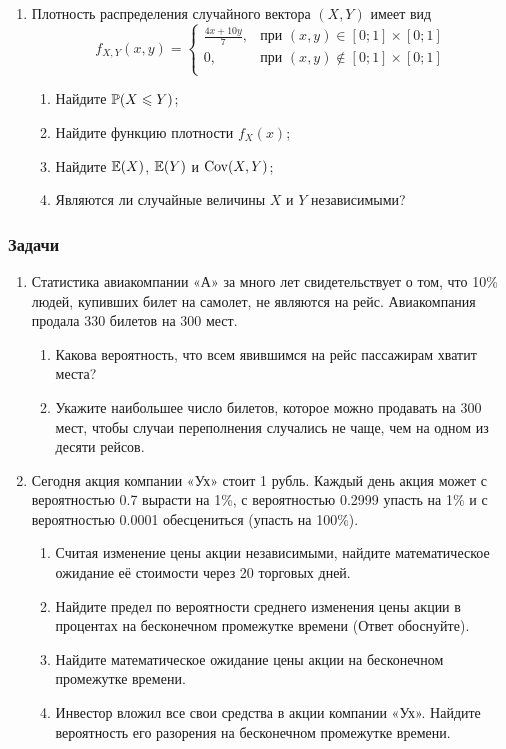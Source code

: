 \begin{enumerate}
\item Плотность распределения случайного вектора $(X,Y)$ имеет вид
\[
f_{X,Y}(x,y) =
\begin{cases}
\frac{4x+10y}{7}, & \text{при } (x,y) \in [0;1] \times [0;1] \\
0 , & \text{при } (x,y) \not\in [0;1] \times [0;1] \\
\end{cases}
\]
\begin{enumerate}
\item Найдите $\P(X \leq Y)$;
\item Найдите функцию плотности $f_X(x)$;
\item Найдите $\E(X)$, $\E(Y)$ и $\Cov(X, Y)$;
\item Являются ли случайные величины $X$ и $Y$ независимыми?
\end{enumerate}
\end{enumerate}

\subsubsection*{Задачи}

\begin{enumerate}[resume]

\item Статистика авиакомпании «А» за много лет свидетельствует о том, что 10\% людей, купивших билет на самолет, не являются на рейс. Авиакомпания продала 330 билетов на 300 мест.
\begin{enumerate}
\item Какова вероятность, что всем явившимся на рейс пассажирам хватит места?
\item Укажите наибольшее число билетов, которое можно продавать на 300 мест, чтобы случаи переполнения случались не чаще, чем на одном из десяти рейсов.
\end{enumerate}

\item Сегодня акция компании «Ух» стоит 1 рубль. Каждый день акция может с вероятностью 0.7 вырасти на 1\%, с вероятностью 0.2999 упасть на 1\% и с вероятностью 0.0001 обесцениться (упасть на 100\%).
\begin{enumerate}
\item Считая изменение цены акции независимыми, найдите математическое ожидание её стоимости через 20 торговых дней.
\item Найдите предел по вероятности среднего изменения цены акции в процентах на бесконечном промежутке времени (Ответ обоснуйте).
\item Найдите математическое ожидание цены акции на бесконечном промежутке времени.
\item Инвестор вложил все свои средства в акции компании «Ух». Найдите вероятность его разорения на бесконечном промежутке времени.
\end{enumerate}
\end{enumerate}



